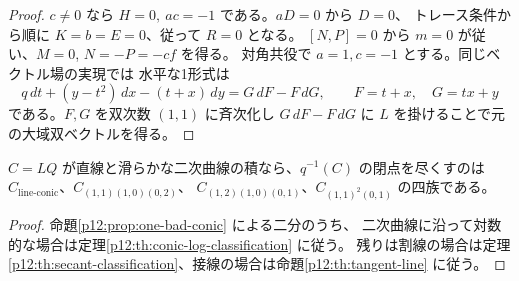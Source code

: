 \begin{proof}
$c\ne0$ なら $H=0,\ ac=-1$ である。$aD=0$ から $D=0$、
トレース条件から順に $K=b=E=0$、従って $R=0$ となる。
$[N,P]=0$ から $m=0$ が従い、$M=0$, $N=-P=-cf$ を得る。
対角共役で $a=1,c=-1$ とする。同じベクトル場の実現では
水平な1形式は
\[
 q\,dt+(y-t^2)\,dx-(t+x)\,dy
 = G\,dF-F\,dG,\qquad F=t+x,\quad G=tx+y
\]
である。$F,G$ を双次数 $(1,1)$ に斉次化し $G\,dF-F\,dG$ に
$L$ を掛けることで元の大域双ベクトルを得る。
\end{proof}


\begin{theorem}\label{p12:th:wholeconic}
$C=LQ$ が直線と滑らかな二次曲線の積なら、$q^{-1}(C)$ の閉点を尽くすのは
$C_{\mathrm{line\text{-}conic}}$、$C_{(1,1)(1,0)(0,2)}$、
$C_{(1,2)(1,0)(0,1)}$、$C_{(1,1)^2(0,1)}$ の四族である。
\end{theorem}
\begin{proof}
命題\ref{p12:prop:one-bad-conic} による二分のうち、
二次曲線に沿って対数的な場合は定理\ref{p12:th:conic-log-classification} に従う。
残りは割線の場合は定理\ref{p12:th:secant-classification}、接線の場合は命題\ref{p12:th:tangent-line} に従う。
\end{proof}

